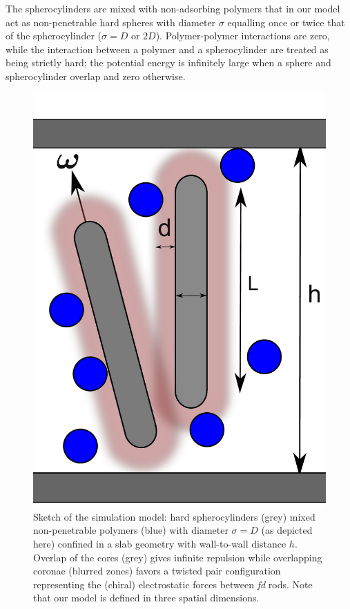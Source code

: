 The spherocylinders are mixed with non-adsorbing polymers that in our model act as non-penetrable hard spheres with diameter $\sigma$ equalling once or twice that of the spherocylinder ($\sigma = D$ or $2D$). Polymer-polymer interactions are zero, while the interaction between a polymer and a spherocylinder are treated as being strictly hard;  the potential energy is infinitely large when a  sphere and spherocylinder overlap and zero otherwise.



\begin{figure}
	\includegraphics[width = 0.5 \columnwidth]{figures/chapter-6/spheromans}
	\caption{ Sketch of the simulation model: hard spherocylinders (grey) mixed non-penetrable polymers (blue) with diameter $\sigma = D$ (as depicted here) confined in a slab geometry with wall-to-wall distance $h$. Overlap of the cores (grey) gives infinite repulsion while overlapping coronae (blurred zones) favors a twisted pair configuration representing the (chiral) electrostatic forces between {\em fd} rods. Note that our model is defined in three spatial dimensions. }
	\label{sketch}
\end{figure}



